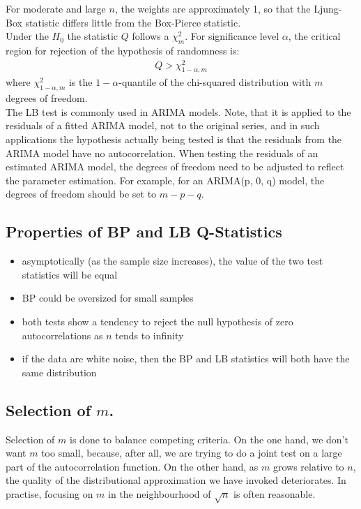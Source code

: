 For moderate and large $n$, the weights are approximately 1, so that the Ljung-Box statistic differs little from the Box-Pierce statistic.\\
Under the $H_{0}$ the statistic $Q$ follows a $\chi_{m}^{2}$. For significance level $\alpha$, the critical region for rejection of the hypothesis of randomness is:
\begin{eqnarray}
	Q > \chi_{1 - \alpha, m}^{2}
\end{eqnarray}
where $\chi_{1 - \alpha, m}^{2}$ is the $1 - \alpha$-quantile of the chi-squared distribution with $m$ degrees of freedom.\\
The LB test is commonly used in ARIMA models. Note, that it is applied to the residuals of a fitted ARIMA model, not to the original series, and in such applications the hypothesis actually being tested is that the residuals from the ARIMA model have no autocorrelation. When testing the residuals of an estimated ARIMA model, the degrees of freedom need to be adjusted to reflect the parameter estimation. For example, for an ARIMA(p, 0, q) model, the degrees of freedom should be set to $m - p - q$.

\subsection{Properties of BP and LB Q-Statistics}
\begin{itemize}
	\item asymptotically (as the sample size increases), the value of the two test statistics will be equal
	\item BP could be oversized for small samples
	\item both tests show a tendency to reject the null hypothesis of zero autocorrelations as $n$ tends to infinity
	\item if the data are white noise, then the BP and LB statistics will both have the same distribution
\end{itemize}

\subsection{Selection of $m$.}
Selection of $m$ is done to balance competing criteria. On the one hand, we don't want $m$ too small, because, after all, we are trying to do a joint test on a large part of the autocorrelation function. On the other hand, as $m$ grows relative to $n$, the quality of the distributional approximation we have invoked deteriorates. In practise, focusing on $m$ in the neighbourhood of $\sqrt{n}$ is often reasonable.
 
